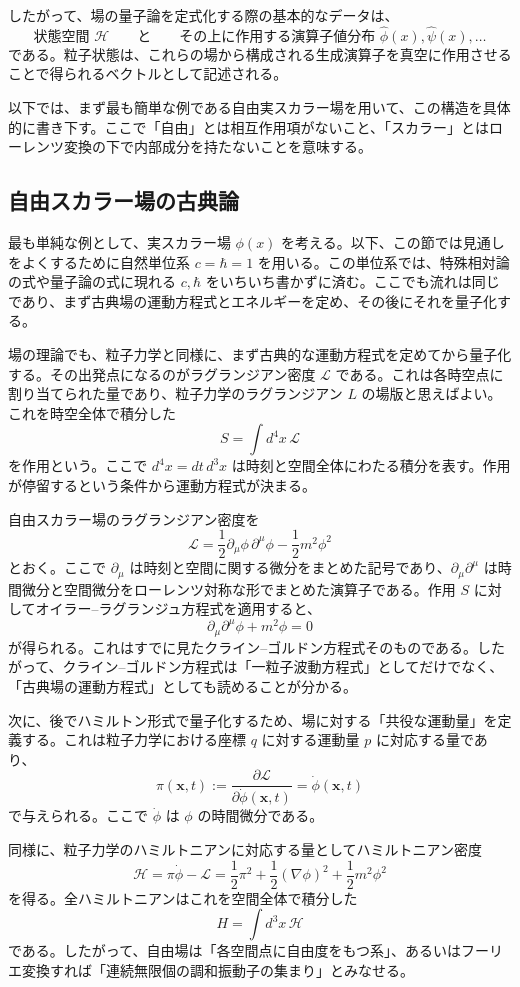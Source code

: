 したがって、場の量子論を定式化する際の基本的なデータは、
\[
\text{状態空間 } \mathcal{H}
\qquad \text{と} \qquad
\text{その上に作用する演算子値分布 } \hat{\phi}(x), \hat{\psi}(x), \dots
\]
である。粒子状態は、これらの場から構成される生成演算子を真空に作用させることで得られるベクトルとして記述される。

以下では、まず最も簡単な例である自由実スカラー場を用いて、この構造を具体的に書き下す。ここで「自由」とは相互作用項がないこと、「スカラー」とはローレンツ変換の下で内部成分を持たないことを意味する。

\subsection{自由スカラー場の古典論}
最も単純な例として、実スカラー場 $\phi(x)$ を考える。以下、この節では見通しをよくするために自然単位系 $c=\hbar=1$ を用いる。この単位系では、特殊相対論の式や量子論の式に現れる $c,\hbar$ をいちいち書かずに済む。ここでも流れは同じであり、まず古典場の運動方程式とエネルギーを定め、その後にそれを量子化する。

場の理論でも、粒子力学と同様に、まず古典的な運動方程式を定めてから量子化する。その出発点になるのがラグランジアン密度 $\mathcal{L}$ である。これは各時空点に割り当てられた量であり、粒子力学のラグランジアン $L$ の場版と思えばよい。これを時空全体で積分した
\[
S = \int d^4x\, \mathcal{L}
\]
を作用という。ここで $d^4x = dt\,d^3x$ は時刻と空間全体にわたる積分を表す。作用が停留するという条件から運動方程式が決まる。

自由スカラー場のラグランジアン密度を
\[
\mathcal{L} = \frac{1}{2}\partial_\mu \phi \, \partial^\mu \phi - \frac{1}{2}m^2\phi^2
\]
とおく。ここで $\partial_\mu$ は時刻と空間に関する微分をまとめた記号であり、$\partial_\mu \partial^\mu$ は時間微分と空間微分をローレンツ対称な形でまとめた演算子である。作用 $S$ に対してオイラー--ラグランジュ方程式を適用すると、
\[
\partial_\mu \partial^\mu \phi + m^2 \phi = 0
\]
が得られる。これはすでに見たクライン--ゴルドン方程式そのものである。したがって、クライン--ゴルドン方程式は「一粒子波動方程式」としてだけでなく、「古典場の運動方程式」としても読めることが分かる。

次に、後でハミルトン形式で量子化するため、場に対する「共役な運動量」を定義する。これは粒子力学における座標 $q$ に対する運動量 $p$ に対応する量であり、
\[
\pi(\mathbf{x},t) := \frac{\partial \mathcal{L}}{\partial \dot{\phi}(\mathbf{x},t)} = \dot{\phi}(\mathbf{x},t)
\]
で与えられる。ここで $\dot{\phi}$ は $\phi$ の時間微分である。

同様に、粒子力学のハミルトニアンに対応する量としてハミルトニアン密度
\[
\mathcal{H} = \pi \dot{\phi} - \mathcal{L}
= \frac{1}{2}\pi^2 + \frac{1}{2}(\nabla \phi)^2 + \frac{1}{2}m^2\phi^2
\]
を得る。全ハミルトニアンはこれを空間全体で積分した
\[
H = \int d^3x\, \mathcal{H}
\]
である。したがって、自由場は「各空間点に自由度をもつ系」、あるいはフーリエ変換すれば「連続無限個の調和振動子の集まり」とみなせる。

